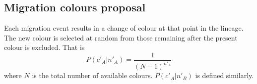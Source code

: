 \documentclass[a4paper, 11pt]{article}
\begin{document}
\subsection{Migration colours proposal}

Each migration event results in a change of colour at that point in
the lineage. The new colour is selected at random from those remaining
after the present colour is excluded. That is
\begin{equation}
  P(c'_A|n'_A) = \frac{1}{(N-1)^{n'_A}}
\end{equation}
where $N$ is the total number of available colours. $P(c'_A|n'_B)$ is
defined similarly.
\end{document}
